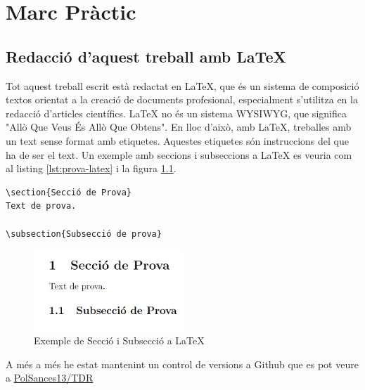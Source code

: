 \part{Marc Pràctic}

\chapter{Redacció d'aquest treball amb \LaTeX}

Tot aquest treball escrit està redactat en LaTeX, que és un sistema de composició textos orientat a la creació de documents profesional, especialment s'utilitza en la redacció d'articles científics.
LaTeX no és un sistema WYSIWYG, que significa "Allò Que Veus És Allò Que Obtens". En lloc d'això, amb LaTeX, treballes amb un text sense format amb etiquetes. Aquestes etiquetes són instruccions del que ha de ser el text.
Un exemple amb seccions i subseccions a LaTeX es veuria com al listing \ref{lst:prova-latex} i la figura \ref{fig:prova-latex}.

\begin{lstlisting}[style=latex, caption={Exemple de Secció i Subsecció a LaTeX}, label={lst:prova-latex}]
\section{Secció de Prova}
Text de prova.

\subsection{Subsecció de prova}

\end{lstlisting}

\begin{figure}[h]
    \centering
    \includegraphics[width=0.5\textwidth]{img/figures/prova-codi-latex.png}
    \caption{Exemple de Secció i Subsecció a LaTeX}
    \label{fig:prova-latex}
\end{figure}


A més a més he estat mantenint un control de versions a Github que es pot veure a \href{https://github.com/PolSances13/TDR}{PolSances13/TDR}

